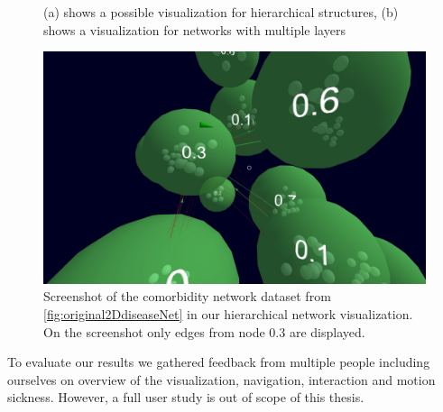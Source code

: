 \begin{figure}[h]
\begin{subfigure}[b]{0.50\columnwidth}
      \label{fig:2dmultilayerVis}
    \end{subfigure}
    \caption[Optional caption for the figure list (often used to abbreviate long captions)]{(a) shows a possible visualization for hierarchical structures, (b) shows a visualization for networks with multiple layers} %
    \label{fig:referenceVisualizations} 
  \end{figure}

\begin{figure}[h]
    \centering
    \includegraphics[width=1\textwidth]{graphics/conceptScreenshot.jpg}
    \caption{Screenshot of the comorbidity network dataset from \ref{fig:original2DdiseaseNet} in our hierarchical network visualization. On the screenshot only edges from node 0.3 are displayed.} %
    \label{fig:conceptSketch} 
\end{figure}

To evaluate our results we gathered feedback from multiple people including ourselves on overview of the visualization, navigation, interaction and motion sickness. However, a full user study is out of scope of this thesis.